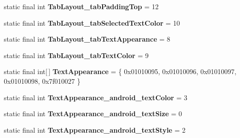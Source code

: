 \begin{DoxyCompactItemize}
\item 
\hypertarget{classandroid_1_1support_1_1design_1_1_r_1_1styleable_a703b4a603e37f5394dd946d44278424c}{}static final int {\bfseries Tab\+Layout\+\_\+tab\+Padding\+Top} = 12\label{classandroid_1_1support_1_1design_1_1_r_1_1styleable_a703b4a603e37f5394dd946d44278424c}

\item 
\hypertarget{classandroid_1_1support_1_1design_1_1_r_1_1styleable_ae1d2a6b701002c2b0ac537ba670c9494}{}static final int {\bfseries Tab\+Layout\+\_\+tab\+Selected\+Text\+Color} = 10\label{classandroid_1_1support_1_1design_1_1_r_1_1styleable_ae1d2a6b701002c2b0ac537ba670c9494}

\item 
\hypertarget{classandroid_1_1support_1_1design_1_1_r_1_1styleable_a2b960a4f2c5c0cd6831652cc2cf9844d}{}static final int {\bfseries Tab\+Layout\+\_\+tab\+Text\+Appearance} = 8\label{classandroid_1_1support_1_1design_1_1_r_1_1styleable_a2b960a4f2c5c0cd6831652cc2cf9844d}

\item 
\hypertarget{classandroid_1_1support_1_1design_1_1_r_1_1styleable_a5dee3b9d7a0f68858b1fd00fe184d831}{}static final int {\bfseries Tab\+Layout\+\_\+tab\+Text\+Color} = 9\label{classandroid_1_1support_1_1design_1_1_r_1_1styleable_a5dee3b9d7a0f68858b1fd00fe184d831}

\item 
\hypertarget{classandroid_1_1support_1_1design_1_1_r_1_1styleable_a23dc46ec989f92f528b46568dad7e726}{}static final int\mbox{[}$\,$\mbox{]} {\bfseries Text\+Appearance} = \{ 0x01010095, 0x01010096, 0x01010097, 0x01010098, 0x7f010027 \}\label{classandroid_1_1support_1_1design_1_1_r_1_1styleable_a23dc46ec989f92f528b46568dad7e726}

\item 
\hypertarget{classandroid_1_1support_1_1design_1_1_r_1_1styleable_a129155598b9f1854731c9f078ece488f}{}static final int {\bfseries Text\+Appearance\+\_\+android\+\_\+text\+Color} = 3\label{classandroid_1_1support_1_1design_1_1_r_1_1styleable_a129155598b9f1854731c9f078ece488f}

\item 
\hypertarget{classandroid_1_1support_1_1design_1_1_r_1_1styleable_a4ca078b59bd3cea0f1cc46eb1ba33efa}{}static final int {\bfseries Text\+Appearance\+\_\+android\+\_\+text\+Size} = 0\label{classandroid_1_1support_1_1design_1_1_r_1_1styleable_a4ca078b59bd3cea0f1cc46eb1ba33efa}

\item 
\hypertarget{classandroid_1_1support_1_1design_1_1_r_1_1styleable_afdc1e2a3b8c14b12194550bf78f9b051}{}static final int {\bfseries Text\+Appearance\+\_\+android\+\_\+text\+Style} = 2\label{classandroid_1_1support_1_1design_1_1_r_1_1styleable_afdc1e2a3b8c14b12194550bf78f9b051}


\end{DoxyCompactItemize}
